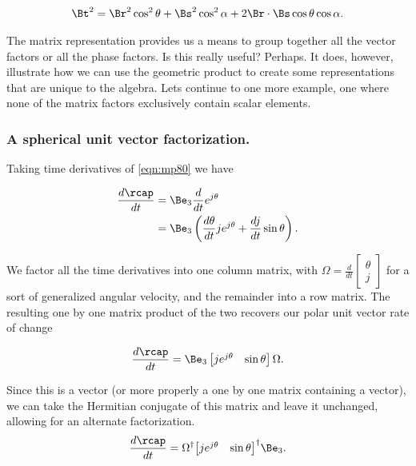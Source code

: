 \begin{align}\label{eqn:mp170}
\Bt^2 = 
\Br^2 \cos^2 \theta
+\Bs^2 \cos^2 \alpha
+ 2 \Br \cdot \Bs \cos\theta \cos\alpha.
\end{align}

The matrix representation provides us a means to group together all the vector factors or all the phase factors.  Is this really useful?  Perhaps.  It does, however, illustrate how we can use the geometric product to create some representations that are unique to the algebra.  Lets continue to one more example, one where none of the matrix factors exclusively contain scalar elements.

\subsubsection{A spherical unit vector factorization.}

Taking time derivatives of \ref{eqn:mp80} we have

\begin{align*}
\frac{d\rcap}{dt} 
&= \Be_3 \frac{d}{dt} e^{j \theta} \\
&= \Be_3 \left( \frac{d\theta}{dt} j e^{j \theta} + \frac{dj}{dt} \sin\theta \right).
\end{align*}

We factor all the time derivatives into one column matrix, with
$\Omega = 
\frac{d}{dt} \begin{bmatrix}
\theta \\
j
\end{bmatrix}$ for a sort of generalized angular velocity, and the remainder into a row matrix.  The resulting one by one matrix product of the two recovers our polar unit vector rate of change

\begin{align}\label{eqn:mp180}
\frac{d\rcap}{dt} 
= \Be_3 
\begin{bmatrix}
j e^{j \theta} & \sin\theta
\end{bmatrix}
\Omega.
\end{align}

Since this is a vector (or more properly a one by one matrix containing a vector), we can take the Hermitian conjugate of this matrix and leave it unchanged, allowing for an alternate factorization.
\begin{align}\label{eqn:mp190}
\frac{d\rcap}{dt} 
= 
\Omega^\dagger
{\begin{bmatrix}
j e^{j \theta} & \sin\theta
\end{bmatrix}}^\dagger
\Be_3.
\end{align}

